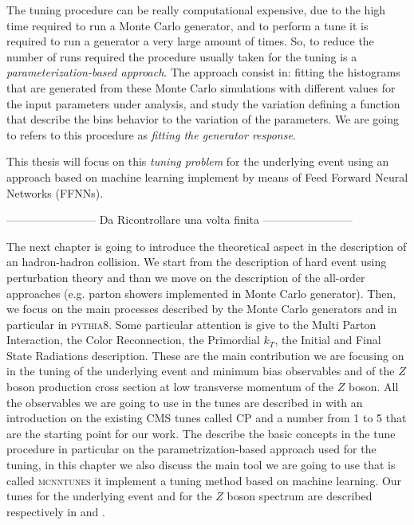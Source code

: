 The tuning procedure can be really computational expensive, due to the high time required to run a Monte Carlo generator, and to perform a tune it is required to run a generator a very large amount of times. So, to reduce the number of runs required the procedure usually taken for the tuning is a \textit{parameterization-based approach}. The approach consist in: fitting the histograms that are generated from these Monte Carlo simulations with different values for the input parameters under analysis, and study the variation defining a function that describe the bins behavior to the variation of the parameters. We are going to refers to this procedure as \textit{fitting the generator response}.

\medskip

This thesis will focus on this \textit{tuning problem} for the underlying event using an approach based on machine learning implement by means of Feed Forward Neural Networks (FFNNs). 


------------------------ Da Ricontrollare una volta finita ------------------------


The next chapter is going to introduce the theoretical aspect in the description of an hadron-hadron collision. We start from the description of hard event using perturbation theory and than we move on the description of the all-order approaches (e.g. parton showers implemented in Monte Carlo generator). Then, we focus on the main processes described by the Monte Carlo generators and in particular in \textsc{pythia8}. Some particular attention is give to the Multi Parton Interaction, the Color Reconnection, the Primordial $k_T$, the Initial and Final State Radiations description. These are the main contribution we are focusing on in the tuning of the underlying event and minimum bias observables and of the $Z$ boson production cross section at low transverse momentum of the $Z$ boson. All the observables we are going to use in the tunes are described in  with an introduction on the existing CMS tunes called CP and a number from 1 to 5 that are the starting point for our work. The  describe the basic concepts in the tune procedure in particular on the parametrization-based approach used for the tuning, in this chapter we also discuss the main tool we are going to use that is called \textsc{mcnntunes} it implement a tuning method based on machine learning. Our tunes for the underlying event and for the $Z$ boson spectrum are described respectively in  and .
 